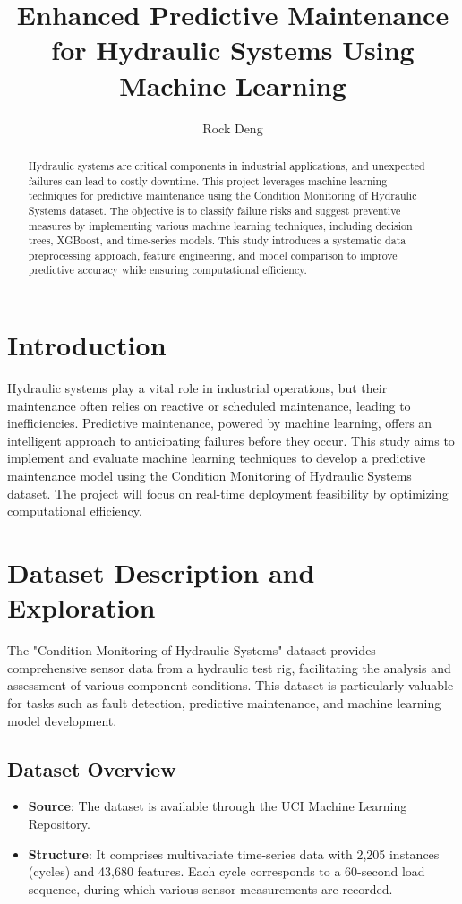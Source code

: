 \documentclass[sigconf]{acmart}
\title{Enhanced Predictive Maintenance for Hydraulic Systems Using Machine Learning}
\author{Rock Deng}
\affiliation{%
  \institution{University of Colorado Boulder}}
\begin{document}
\begin{abstract}
Hydraulic systems are critical components in industrial applications, and unexpected failures can lead to costly downtime. This project leverages machine learning techniques for predictive maintenance using the Condition Monitoring of Hydraulic Systems dataset. The objective is to classify failure risks and suggest preventive measures by implementing various machine learning techniques, including decision trees, XGBoost, and time-series models. This study introduces a systematic data preprocessing approach, feature engineering, and model comparison to improve predictive accuracy while ensuring computational efficiency.
\end{abstract}

\maketitle

\section{Introduction}
Hydraulic systems play a vital role in industrial operations, but their maintenance often relies on reactive or scheduled maintenance, leading to inefficiencies. Predictive maintenance, powered by machine learning, offers an intelligent approach to anticipating failures before they occur. This study aims to implement and evaluate machine learning techniques to develop a predictive maintenance model using the Condition Monitoring of Hydraulic Systems dataset. The project will focus on real-time deployment feasibility by optimizing computational efficiency.

\section{Dataset Description and Exploration} 
The "Condition Monitoring of Hydraulic Systems" dataset provides comprehensive sensor data from a hydraulic test rig, facilitating the analysis and assessment of various component conditions. This dataset is particularly valuable for tasks such as fault detection, predictive maintenance, and machine learning model development.

\subsection{Dataset Overview} 
\begin{itemize} 
    \item \textbf{Source}: The dataset is available through the UCI Machine Learning Repository.
    \item \textbf{Structure}: It comprises multivariate time-series data with 2,205 instances (cycles) and 43,680 features. Each cycle corresponds to a 60-second load sequence, during which various sensor measurements are recorded.
\end{itemize}
\end{document}
